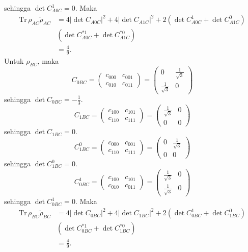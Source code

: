 sehingga $\det C_{A0C}^1 = 0$. Maka
\begin{equation}
	\begin{aligned}
		\mathrm{Tr}\,\rho_{AC}\tilde{\rho}_{AC}
		&=4 |\det C_{A0C}|^2+ 4 |\det C_{A1C}|^2+ 2 (\det C_{A0C}^1 + \det C_{A1C}^0)\\
		&(\det C^{*1}_{A0C} + \det C^{*0}_{A1C})\\
		&=\frac{4}{9}.
	\end{aligned}
\end{equation}
Untuk $\rho_{BC}$, maka
\begin{equation}
	C_{0BC}=
	\begin{pmatrix}
		c_{000} & c_{001} \\
		c_{010} & c_{011}
	\end{pmatrix}=
	\begin{pmatrix}
		0 & \frac{1}{\sqrt{3}} \\
		\frac{1}{\sqrt{3}} & 0
	\end{pmatrix}
\end{equation}
sehingga $\det C_{0BC} = -\frac{1}{3}$.
\begin{equation}
	C_{1BC}=
	\begin{pmatrix}
		c_{100} & c_{101} \\
		c_{110} & c_{111}
	\end{pmatrix}=
	\begin{pmatrix}
		\frac{1}{\sqrt{3}} & 0 \\
		0 & 0
	\end{pmatrix}
\end{equation}
sehingga $\det C_{1BC} = 0$.
\begin{equation}
	C_{1BC}^0=
	\begin{pmatrix}
		c_{000} & c_{001} \\
		c_{110} & c_{111}
	\end{pmatrix}=
	\begin{pmatrix}
		0 & \frac{1}{\sqrt{3}} \\
		0 & 0
	\end{pmatrix}
\end{equation}
sehingga $\det C_{1BC}^0 = 0$.
\begin{equation}
	C_{0BC}^1=
	\begin{pmatrix}
		c_{100} & c_{101} \\
		c_{010} & c_{011}
	\end{pmatrix}=
	\begin{pmatrix}
		\frac{1}{\sqrt{3}} & 0 \\
		\frac{1}{\sqrt{3}} & 0
	\end{pmatrix}
\end{equation}
sehingga $\det C_{0BC}^1 = 0$. Maka
\begin{equation}
	\begin{aligned}
		\mathrm{Tr}\,\rho_{BC}\tilde{\rho}_{BC}
		&=4 |\det C_{0BC}|^2+ 4 |\det C_{1BC}|^2+ 2 (\det C_{0BC}^1 + \det C_{1BC}^0)\\
		&(\det C^{*1}_{0BC} + \det C^{*0}_{1BC})\\
		&=\frac{4}{9}.
	\end{aligned}
\end{equation}

